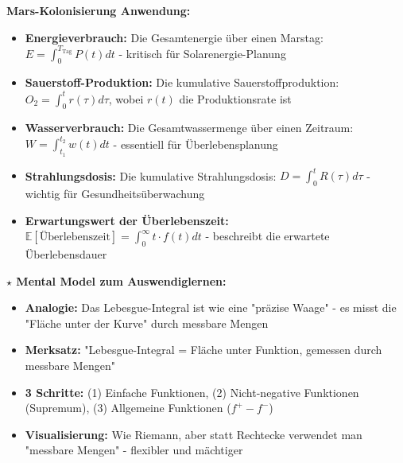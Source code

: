 \begin{denoobification}
\textbf{Mars-Kolonisierung Anwendung:}
\begin{itemize}
    \item \textbf{Energieverbrauch:} Die Gesamtenergie über einen Marstag: $E = \int_{0}^{T_{\text{Tag}}} P(t) dt$ - kritisch für Solarenergie-Planung
    \item \textbf{Sauerstoff-Produktion:} Die kumulative Sauerstoffproduktion: $O_2 = \int_{0}^{t} r(\tau) d\tau$, wobei $r(t)$ die Produktionsrate ist
    \item \textbf{Wasserverbrauch:} Die Gesamtwassermenge über einen Zeitraum: $W = \int_{t_1}^{t_2} w(t) dt$ - essentiell für Überlebensplanung
    \item \textbf{Strahlungsdosis:} Die kumulative Strahlungsdosis: $D = \int_{0}^{t} R(\tau) d\tau$ - wichtig für Gesundheitsüberwachung
    \item \textbf{Erwartungswert der Überlebenszeit:} $\mathbb{E}[\text{Überlebenszeit}] = \int_{0}^{\infty} t \cdot f(t) dt$ - beschreibt die erwartete Überlebensdauer
\end{itemize}

\textbf{$\star$ Mental Model zum Auswendiglernen:}
\begin{itemize}
    \item \textbf{Analogie:} Das Lebesgue-Integral ist wie eine "präzise Waage" - es misst die "Fläche unter der Kurve" durch messbare Mengen
    \item \textbf{Merksatz:} "Lebesgue-Integral = Fläche unter Funktion, gemessen durch messbare Mengen"
    \item \textbf{3 Schritte:} (1) Einfache Funktionen, (2) Nicht-negative Funktionen (Supremum), (3) Allgemeine Funktionen ($f^+ - f^-$)
    \item \textbf{Visualisierung:} Wie Riemann, aber statt Rechtecke verwendet man "messbare Mengen" - flexibler und mächtiger
\end{itemize}

\begin{center}
\end{center}
\end{denoobification}
